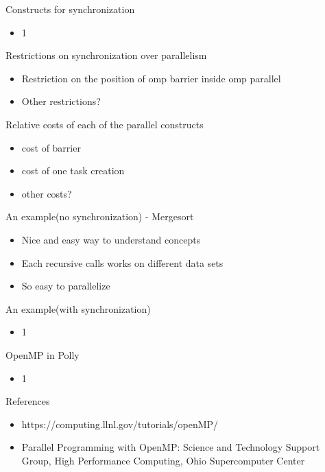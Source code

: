 \documentclass[14pt]{beamer}
\begin{document}
\begin{frame}{Constructs for synchronization}
\begin{itemize}
\item 1
\end{itemize}
\end{frame}

\begin{frame}{Restrictions on synchronization over parallelism}
\begin{itemize}
\item Restriction on the position of omp barrier inside omp parallel
\item Other restrictions?
\end{itemize}
\end{frame}

\begin{frame}{Relative costs of each of the parallel constructs}
\begin{itemize}
\item cost of barrier
\item cost of one task creation
\item other costs?
\end{itemize}
\end{frame}

\begin{frame}{An example(no synchronization) - Mergesort}
\begin{itemize}
\item Nice and easy way to understand concepts
\item Each recursive calls works on different data sets
\item So easy to parallelize
\end{itemize}
\end{frame}

\begin{frame}{An example(with synchronization)}
\begin{itemize}
\item 1
\end{itemize}
\end{frame}

\begin{frame}{OpenMP in Polly}
\begin{itemize}
\item 1
\end{itemize}
\end{frame}


\begin{frame}{References}
\begin{itemize}
\item https://computing.llnl.gov/tutorials/openMP/
\item Parallel Programming with OpenMP: Science and Technology Support Group, High Performance Computing, Ohio Supercomputer Center
\end{itemize}
\end{frame}
\end{document}
